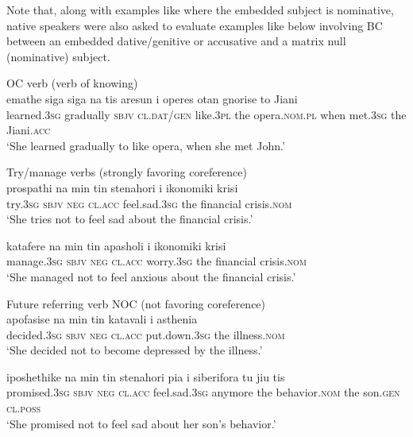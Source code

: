 \documentclass[output=paper]{langsci/langscibook}
\begin{document}
Note that, along with examples like  where the embedded subject is nominative, native speakers were also asked to evaluate examples like  below involving BC between an embedded dative\slash genitive or accusative  and a matrix null (nominative) subject.\pagebreak

\ea%
    \label{ex:alexiadou:15}
OC verb (verb of knowing)\\
\ea \gll emathe {siga siga} na   tis aresun i operes otan   gnorise   to Jiani\\
learned.\textsc{3sg} gradually \textsc{sbjv} \textsc{cl.dat\slash gen} like.\textsc{3pl} the opera.\textsc{nom.pl} when met.\textsc{3sg} the Jiani.\textsc{acc}\\
\glt ‘She learned gradually to like opera, when she met John.’

Try\slash manage verbs (strongly favoring coreference)\\

\ex \gll  prospathi   na   min   tin   stenahori   i ikonomiki krisi \\
    try.\textsc{3sg} \textsc{sbjv}  \textsc{neg}  \textsc{cl.acc} feel.sad.\textsc{3sg}  the financial crisis.\textsc{nom}\\
    \glt ‘She tries not to feel sad about the financial crisis.’

\ex\gll  katafere   na   min   tin   apasholi    i ikonomiki krisi\\
    manage.\textsc{3sg} \textsc{sbjv}  \textsc{neg}  \textsc{cl.acc} worry.\textsc{3sg} the financial crisis.\textsc{nom}\\
    \glt ‘She managed not to feel anxious about the financial crisis.’

Future referring verb NOC (not favoring coreference)  \\

\ex \gll apofasise   na   min   tin   katavali   i asthenia\\
         decided.\textsc{3sg} \textsc{sbjv}  \textsc{neg} \textsc{cl.acc}   put.down.\textsc{3sg} the illness.\textsc{nom}\\
    \glt ‘She decided not to become depressed by the illness.’

\ex \gll iposhethike   na min   tin   stenahori   pia i   siberifora    tu   jiu    tis \\
         promised.\textsc{3sg} \textsc{sbjv}  \textsc{neg}   \textsc{cl.acc}  feel.sad.\textsc{3sg} anymore the   behavior.\textsc{nom}  the    son.\textsc{gen}   \textsc{cl.poss}\\
    \glt ‘She promised not to feel sad about her son’s behavior.’
\z
\z
\end{document}

